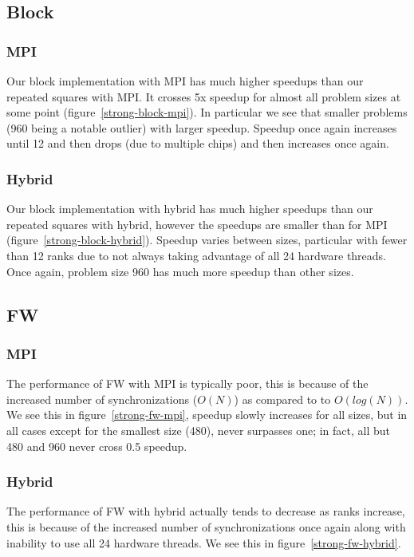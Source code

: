 \subsection{Block}
\subsubsection{MPI}
Our block implementation with MPI has much higher speedups than our repeated
squares with MPI. It crosses 5x speedup for almost all problem sizes at some
point (figure~\ref{strong-block-mpi}). In particular we see that smaller
problems (960 being a notable outlier) with larger speedup. Speedup once again
increases until 12 and then drops (due to multiple chips) and then increases
once again.

\subsubsection{Hybrid}
Our block implementation with hybrid has much higher speedups than our repeated
squares with hybrid, however the speedups are smaller than for MPI
(figure~\ref{strong-block-hybrid}). Speedup varies between sizes, particular
with fewer than 12 ranks due to not always taking advantage of all 24 hardware
threads. Once again, problem size 960 has much more speedup than other sizes.

\subsection{FW}
\subsubsection{MPI}
The performance of FW with MPI is typically poor, this is because of the
increased number of synchronizations ($O(N)$) as compared to to $O(log(N))$. We
see this in figure~\ref{strong-fw-mpi}, speedup slowly increases for all sizes,
but in all cases except for the smallest size (480), never surpasses one; in
fact, all but 480 and 960 never cross 0.5 speedup.

\subsubsection{Hybrid}
The performance of FW with hybrid actually tends to decrease as ranks increase,
this is because of the increased number of synchronizations once again along
with inability to use all 24 hardware threads. We see this in
figure~\ref{strong-fw-hybrid}.

